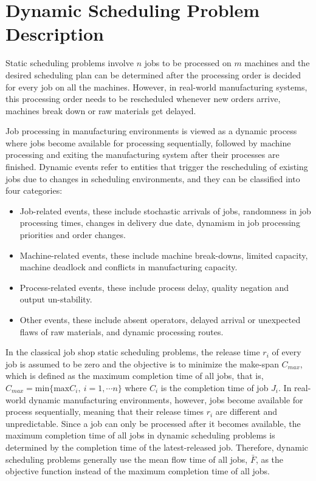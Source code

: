 \section{Dynamic Scheduling Problem Description}
Static scheduling problems involve $n$ jobs to be processed on $m$ machines and the desired scheduling plan can be determined after the processing order is decided for every job on all the machines.
However, in real-world manufacturing systems, this processing order needs to be rescheduled whenever new orders arrive, machines break down or raw materials get delayed.

Job processing in manufacturing environments is viewed as a dynamic process where jobs become available for processing sequentially, followed by machine processing and exiting the manufacturing system after their processes are finished.
Dynamic events refer to entities that trigger the rescheduling of existing jobs due to changes in scheduling environments, and they can be classified into four categories:
\begin{itemize}
	\item Job-related events, these include stochastic arrivals of jobs, randomness in job processing times, changes in delivery due date, dynamism in job processing priorities and order changes.
	\item Machine-related events, these include machine break-downs, limited capacity, machine deadlock and conflicts in manufacturing capacity.
	\item Process-related events, these include process delay, quality negation and output un-stability.
	\item Other events, these include absent operators, delayed arrival or unexpected flaws of raw materials, and dynamic processing routes.
\end{itemize}

In the classical job shop static scheduling problems, the release time $r_i$ of every job is assumed to be zero and the objective is to minimize the make-span $C_{max}$, which is defined as the maximum completion time of all jobs, that is, $C_{max} = \text{min}\{\text{max} C_i,\  i = 1, \cdots n\}$ where $C_i$ is the completion time of job $J_i$.
In real-world dynamic manufacturing environments, however, jobs become available for process sequentially, meaning that their release times $r_i$ are different and unpredictable. 
Since a job can only be processed after it becomes available, the maximum completion time of all jobs in dynamic scheduling problems is determined by the completion time of the latest-released job.
Therefore, dynamic scheduling problems generally use the mean flow time of all jobs, $\bar{F}$, as the objective function instead of the maximum completion time of all jobs.

